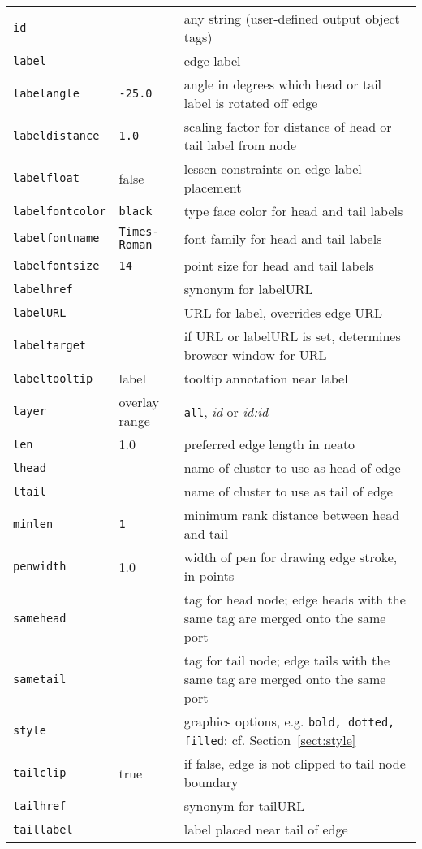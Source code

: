\documentclass[11pt]{article}
\begin{document}
\begin{table}[p]
\begin{tabular}[t]{|l|l|p{3.5in}|}
{\tt id} & & any string (user-defined output object tags) \\
{\tt label} & & edge label \\
{\tt labelangle} & {\tt -25.0} & angle in degrees which head or tail label
is rotated off edge \\
{\tt labeldistance} & {\tt 1.0} & scaling factor for distance of head or tail label from node \\
{\tt labelfloat} & false & lessen constraints on edge label placement \\
{\tt labelfontcolor} & {\tt black} & type face color for head and tail labels\\
{\tt labelfontname} & {\tt Times-Roman} & font family for head and tail labels\\
{\tt labelfontsize} & {\tt 14} & point size for head and tail labels \\
{\tt labelhref} & & synonym for labelURL \\
{\tt labelURL} & & URL for label, overrides edge URL \\
{\tt labeltarget} & & if URL or labelURL is set, determines browser window for URL \\
{\tt labeltooltip} & label & tooltip annotation near label \\
{\tt layer} & overlay range & {\tt all}, {\it id} or {\it id:id} \\
{\tt len} & 1.0 & preferred edge length in neato \\
{\tt lhead} & & name of cluster to use as head of edge \\
{\tt ltail} & & name of cluster to use as tail of edge \\
{\tt minlen} & {\tt 1} & minimum rank distance between head and tail \\
{\tt penwidth} & 1.0 & width of pen for drawing edge stroke, in points \\
{\tt samehead} & & tag for head node; edge heads with the same tag are merged onto
the same port \\
{\tt sametail} & & tag for tail node; edge tails with the same tag are merged onto
the same port \\
{\tt style} & & graphics options, e.g. {\tt bold, dotted, filled}; cf.
Section~\ref{sect:style} \\ 
{\tt tailclip} & true & if false, edge is not clipped to tail node boundary \\
{\tt tailhref} & & synonym for tailURL \\
{\tt taillabel} & & label placed near tail of edge \\

\end{tabular}
\end{table}
\end{document}

